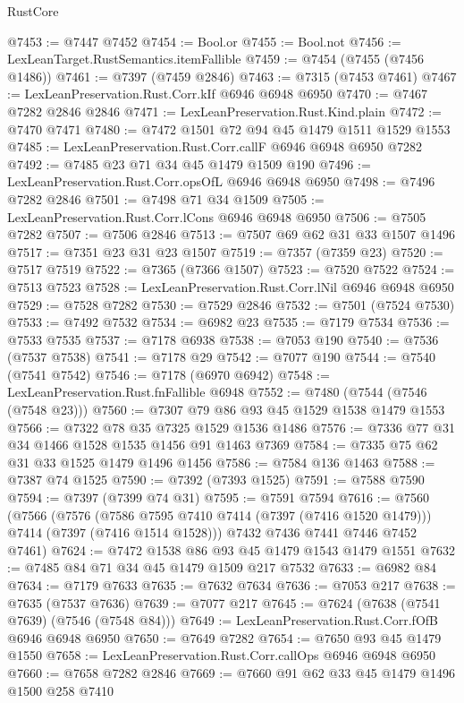 \begin{lexlean}{RustCore}
\begin{coremodule}
@7453 := @7447 @7452
@7454 := Bool.or
@7455 := Bool.not
@7456 := LexLeanTarget.RustSemantics.itemFallible
@7459 := @7454 (@7455 (@7456 @1486))
@7461 := @7397 (@7459 @2846)
@7463 := @7315 (@7453 @7461)
@7467 := LexLeanPreservation.Rust.Corr.kIf @6946 @6948 @6950
@7470 := @7467 @7282 @2846 @2846
@7471 := LexLeanPreservation.Rust.Kind.plain
@7472 := @7470 @7471
@7480 := @7472 @1501 @72 @94 @45 @1479 @1511 @1529 @1553
@7485 := LexLeanPreservation.Rust.Corr.callF @6946 @6948 @6950 @7282
@7492 := @7485 @23 @71 @34 @45 @1479 @1509 @190
@7496 := LexLeanPreservation.Rust.Corr.opsOfL @6946 @6948 @6950
@7498 := @7496 @7282 @2846
@7501 := @7498 @71 @34 @1509
@7505 := LexLeanPreservation.Rust.Corr.lCons @6946 @6948 @6950
@7506 := @7505 @7282
@7507 := @7506 @2846
@7513 := @7507 @69 @62 @31 @33 @1507 @1496
@7517 := @7351 @23 @31 @23 @1507
@7519 := @7357 (@7359 @23)
@7520 := @7517 @7519
@7522 := @7365 (@7366 @1507)
@7523 := @7520 @7522
@7524 := @7513 @7523
@7528 := LexLeanPreservation.Rust.Corr.lNil @6946 @6948 @6950
@7529 := @7528 @7282
@7530 := @7529 @2846
@7532 := @7501 (@7524 @7530)
@7533 := @7492 @7532
@7534 := @6982 @23
@7535 := @7179 @7534
@7536 := @7533 @7535
@7537 := @7178 @6938
@7538 := @7053 @190
@7540 := @7536 (@7537 @7538)
@7541 := @7178 @29
@7542 := @7077 @190
@7544 := @7540 (@7541 @7542)
@7546 := @7178 (@6970 @6942)
@7548 := LexLeanPreservation.Rust.fnFallible @6948
@7552 := @7480 (@7544 (@7546 (@7548 @23)))
@7560 := @7307 @79 @86 @93 @45 @1529 @1538 @1479 @1553
@7566 := @7322 @78 @35 @7325 @1529 @1536 @1486
@7576 := @7336 @77 @31 @34 @1466 @1528 @1535 @1456 @91 @1463 @7369
@7584 := @7335 @75 @62 @31 @33 @1525 @1479 @1496 @1456
@7586 := @7584 @136 @1463
@7588 := @7387 @74 @1525
@7590 := @7392 (@7393 @1525)
@7591 := @7588 @7590
@7594 := @7397 (@7399 @74 @31)
@7595 := @7591 @7594
@7616 := @7560
    (@7566
      (@7576
        (@7586 @7595 @7410 @7414 (@7397 (@7416 @1520 @1479)))
        @7414
        (@7397 (@7416 @1514 @1528)))
      @7432
      @7436
      @7441
      @7446
      @7452
      @7461)
@7624 := @7472 @1538 @86 @93 @45 @1479 @1543 @1479 @1551
@7632 := @7485 @84 @71 @34 @45 @1479 @1509 @217 @7532
@7633 := @6982 @84
@7634 := @7179 @7633
@7635 := @7632 @7634
@7636 := @7053 @217
@7638 := @7635 (@7537 @7636)
@7639 := @7077 @217
@7645 := @7624 (@7638 (@7541 @7639) (@7546 (@7548 @84)))
@7649 := LexLeanPreservation.Rust.Corr.fOfB @6946 @6948 @6950
@7650 := @7649 @7282
@7654 := @7650 @93 @45 @1479 @1550
@7658 := LexLeanPreservation.Rust.Corr.callOps @6946 @6948 @6950
@7660 := @7658 @7282 @2846
@7669 := @7660 @91 @62 @33 @45 @1479 @1496 @1500 @258 @7410

\end{coremodule}
\end{lexlean}
